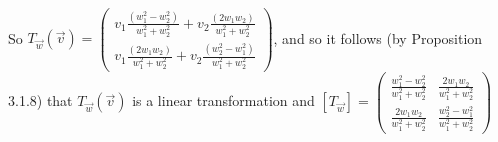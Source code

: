 \documentclass[12pt]{article}
\newenvironment{problem}[2][Problem]
{
	\begin{trivlist} 
		\item[\hskip \labelsep {\bfseries #1 #2:}]
	}
{
	\end{trivlist}
	}
\newenvironment{solution}[1][Solution]
{
	\begin{trivlist} 
		\item[\hskip \labelsep {\itshape #1:}]
	}
	{
	\end{trivlist}
}
\begin{document}
\begin{problem}{4}
\begin{solution}
\begin{align*}
\end{align*}
So $T_{\vec{w}}(\vec{v}) =  \begin{pmatrix} v_{1}\frac{(w_{1}^2 - w_{2}^2)}{w_{1}^2 + w_{2}^2}  + v_{2}\frac{(2w_{1}w_{2})}{w_{1}^2 + w_{2}^2}  \\  v_{1}\frac{(2w_{1}w_{2})}{w_{1}^2 + w_{2}^2}  + v_{2}\frac{(w_{2}^2 - w_{1}^2)}{w_{1}^2 + w_{2}^2}  \end{pmatrix}$, and so it follows (by Proposition 3.1.8) that $T_{\vec{w}}(\vec{v})$ is a linear transformation and $[T_{\vec{w}}]=\begin{pmatrix} \frac{w_{1}^2 - w_{2}^2}{w_{1}^2 + w_{2}^2}  &  \frac{2w_{1}w_{2}}{w_{1}^2 + w_{2}^2}  \\  \frac{2w_{1}w_{2}}{w_{1}^2 + w_{2}^2}  & \frac{w_{2}^2 - w_{1}^2}{w_{1}^2 + w_{2}^2}  \end{pmatrix}
 $ %
 \end{solution}
\end{problem}
\end{document}
